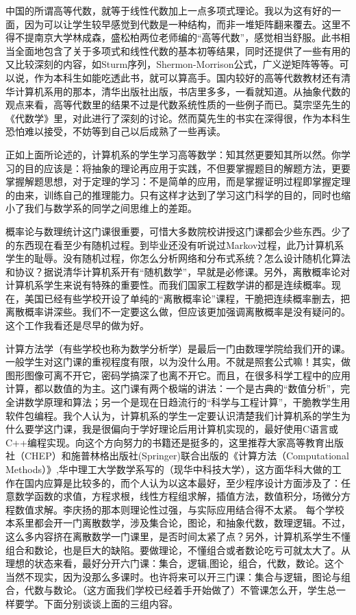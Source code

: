 中国的所谓高等代数，就等于线性代数加上一点多项式理论。我以为这有好的一面，因为可以让学生较早感觉到代数是一种结构，而非一堆矩阵翻来覆去。这里不得不提南京大学林成森，盛松柏两位老师编的“高等代数”，感觉相当舒服。此书相当全面地包含了关于多项式和线性代数的基本初等结果，同时还提供了一些有用的又比较深刻的内容，如Sturm序列，Shermon-Morrison公式，广义逆矩阵等等。可以说，作为本科生如能吃透此书，就可以算高手。国内较好的高等代数教材还有清华计算机系用的那本，清华出版社出版，书店里多多，一看就知道。从抽象代数的观点来看，高等代数里的结果不过是代数系统性质的一些例子而已。莫宗坚先生的《代数学》里，对此进行了深刻的讨论。然而莫先生的书实在深得很，作为本科生恐怕难以接受，不妨等到自己以后成熟了一些再读。


正如上面所论述的，计算机系的学生学习高等数学：知其然更要知其所以然。你学习的目的应该是：将抽象的理论再应用于实践，不但要掌握题目的解题方法，更要掌握解题思想，对于定理的学习：不是简单的应用，而是掌握证明过程即掌握定理的由来，训练自己的推理能力。只有这样才达到了学习这门科学的目的，同时也缩小了我们与数学系的同学之间思维上的差距。


概率论与数理统计这门课很重要，可惜大多数院校讲授这门课都会少些东西。少了的东西现在看至少有随机过程。到毕业还没有听说过Markov过程，此乃计算机系学生的耻辱。没有随机过程，你怎么分析网络和分布式系统？怎么设计随机化算法和协议？据说清华计算机系开有“随机数学”，早就是必修课。另外，离散概率论对计算机系学生来说有特殊的重要性。而我们国家工程数学讲的都是连续概率。现在，美国已经有些学校开设了单纯的“离散概率论”课程，干脆把连续概率删去，把离散概率讲深些。我们不一定要这么做，但应该更加强调离散概率是没有疑问的。这个工作我看还是尽早的做为好。


计算方法学（有些学校也称为数学分析学）是最后一门由数理学院给我们开的课。一般学生对这门课的重视程度有限，以为没什么用。不就是照套公式嘛！其实，做图形图像可离不开它，密码学搞深了也离不开它。而且，在很多科学工程中的应用计算，都以数值的为主。这门课有两个极端的讲法：一个是古典的“数值分析”，完全讲数学原理和算法；另一个是现在日趋流行的“科学与工程计算”，干脆教学生用软件包编程。我个人认为，计算机系的学生一定要认识清楚我们计算机系的学生为什么要学这门课，我是很偏向于学好理论后用计算机实现的，最好使用C语言或C++编程实现。向这个方向努力的书籍还是挺多的，这里推荐大家高等教育出版社（CHEP）和施普林格出版社(Springer)联合出版的《计算方法（Computational Methods）》,华中理工大学数学系写的（现华中科技大学），这方面华科大做的工作在国内应算是比较多的，而个人认为以这本最好，至少程序设计方面涉及了：任意数学函数的求值，方程求根，线性方程组求解，插值方法，数值积分，场微分方程数值求解。李庆扬的那本则理论性过强，与实际应用结合得不太紧。 
每个学校本系里都会开一门离散数学，涉及集合论，图论，和抽象代数，数理逻辑。不过，这么多内容挤在离散数学一门课里，是否时间太紧了点？另外，计算机系学生不懂组合和数论，也是巨大的缺陷。要做理论，不懂组合或者数论吃亏可就太大了。从理想的状态来看，最好分开六门课：集合，逻辑,图论，组合，代数，数论。这个当然不现实，因为没那么多课时。也许将来可以开三门课：集合与逻辑，图论与组合，代数与数论。（这方面我们学校已经着手开始做了）不管课怎么开，学生总一样要学。下面分别谈谈上面的三组内容。


